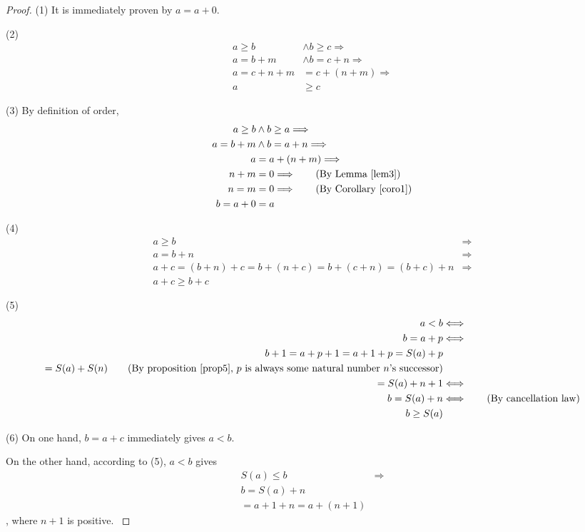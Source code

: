 \begin{proof}
(1) It is immediately proven by $a=a+0$.

(2) 
\begin{align*}
a \geq b &\wedge b \geq c \Longrightarrow \\
a = b+m &\wedge b = c+n \Longrightarrow \\
a = c+n+m &= c+(n+m) \Longrightarrow \\
a &\geq c 
\end{align*}

(3)
By definition of order, 
\begin{align*}
a \geq b &\wedge b \geq a \Longrightarrow \\
a = b+m &\wedge b = a+n \Longrightarrow \\
a &= a+(n+m) \Longrightarrow \\
n+m&=0 \Longrightarrow \tag{By Lemma \ref{lem3}}\\
n=m&=0 \Longrightarrow \tag{By Corollary \ref{coro1}} \\
b=a+0&=a
\end{align*}

(4)
\begin{align*}
a \geq b &\Longrightarrow \\
a = b+n &\Longrightarrow \\
a+c=(b+n)+c=b+(n+c)=b+(c+n)=(b+c)+n &\Longrightarrow \\
a+c \geq b+c
\end{align*}

(5)
\begin{align*}
a<b &\Longleftrightarrow \\
b=a+p &\Longleftrightarrow \\
b+1=a+p+1=a+1+p=S(a)+p \\
=S(a)+S(n) \tag{By proposition \ref{prop5}, $p$ is always some natural number $n$'s successor}\\
=S(a)+n+1 &\Longleftrightarrow \\
b=S(a)+n &\Longleftrightarrow \tag{By cancellation law} \\
b \geq S(a)
\end{align*} \label{prop.5}

(6)
On one hand, $b=a+c$ immediately gives $a<b$.

On the other hand, according to (5), $a<b$ gives 
\begin{align*}
S(a) \leq b  &\Longrightarrow\\
b = S(a) + n& \\
= a+1+n = a+(n+1)&
\end{align*}, where $n+1$ is positive. \label{prop.6}
\end{proof}

